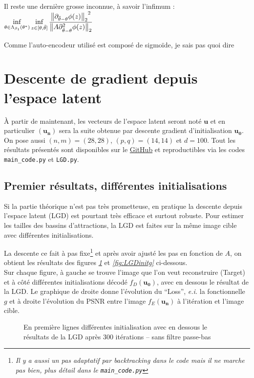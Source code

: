 \documentclass[hidelinks, french]{article} %
\newcommand{\ei}{\textit{e.i. }}
\renewcommand{\bf}[1]{\boldsymbol{#1}}
\theoremstyle{enonce}
\theoremstyle{special}
\theoremstyle{rq}
\theoremstyle{exo}
\theoremstyle{demo}
\begin{document}
Il reste une dernière grosse inconnue, à savoir l'infimum :\quad ${\displaystyle\inf_{\theta\in\Lambda_{\beta_1}(\theta^*)}\inf_{z\in[\theta,\Tilde{\theta}]}\frac{{\big\|\partial_{\Tilde{\theta}-\theta}\phi(z)\big\|_2}^2}{\big\|A\partial^2_{\Tilde{\theta}-\theta}\phi(z)\big\|_2}}$

Comme l'auto-encodeur utilisé est composé de sigmoïde, je sais pas quoi dire



\newpage



\section{Descente de gradient depuis l'espace latent}

\`A partir de maintenant, les vecteurs de l'espace latent seront noté $\bf{u}$ et en particulier $(\bf{u_n})$ sera la suite obtenue par descente gradient d'initialisation $\bf{u_0}$. On pose aussi $(n,m)=(28,28)$, $(p,q)=(14,14)$ et $d=100$. Tout les résultats présentés sont disponibles sur le  \href{https://www.youtube.com/watch?v=dQw4w9WgXcQ&pp=ygUIcmlja3JvbGw%3D}{GitHub} et reproductibles via les codes \texttt{main\_code.py} et \texttt{LGD.py}. 



\subsection{Premier résultats, différentes initialisations}\label{sec:res LDG}

Si la partie théorique n'est pas très prometteuse, en pratique la descente depuis l'espace latent (LGD) est pourtant très efficace et surtout robuste. Pour estimer les tailles des bassins d'attractions, la LGD est faites sur la même image cible avec différentes initialisations. 

La descente ce fait à pas fixe\footnote{\emph{Il y a aussi un pas adaptatif par backtracking dans le code mais il ne marche pas bien, plus détail dans le \texttt{main\_code.py}}} et après avoir ajusté les pas en fonction de $A$, on obtient les résultats des figures \textit{\ref{fig:LGDinits}} et \textit{\ref{fig:LGDinitg}} ci-dessous.
\\
Sur chaque figure, à gauche se trouve l'image que l'on veut reconstruire (Target) et à côté différentes initialisations décodé $f_D(\bf{u_0})$, avec en dessous le résultat de la LGD.
Le graphique de droite donne l'évolution du ``Loss'', \ei la fonctionnelle $g$ et à droite l'évolution du PSNR entre l'image $f_E(\bf{u_n})$ à l'itération et l'image cible.
\begin{figure}[H]\centering
	
    \caption{En première lignes différentes initialisation avec en dessous le résultats de la LGD après 300 itérations -- sans filtre passe-bas}
    \label{fig:LGDinits}
\end{figure}
\end{document}
